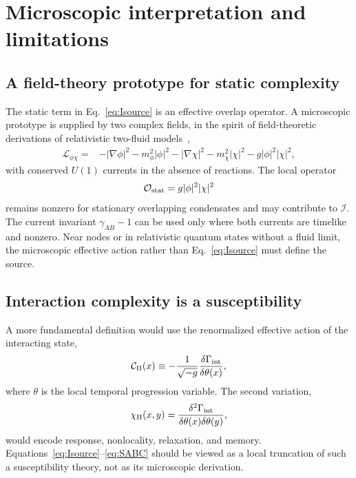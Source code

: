 \documentclass[11pt]{article}
\newcommand{\Lag}{\mathcal L}
\begin{document}
\section{Microscopic interpretation and limitations}

\subsection{A field-theory prototype for static complexity}

The static term in Eq.~\eqref{eq:Isource} is an effective overlap operator.  A microscopic prototype is supplied by two complex fields, in the spirit of field-theoretic derivations of relativistic two-fluid models~\cite{Alford2013},
\begin{align}
\Lag_{\phi\chi}
={}&-|\nabla\phi|^2-m_\phi^2|\phi|^2
-|\nabla\chi|^2-m_\chi^2|\chi|^2
-g|\phi|^2|\chi|^2,
\label{eq:complexScalarModel}
\end{align}
with conserved $U(1)$ currents in the absence of reactions.  The local operator
\begin{equation}
\mathcal O_{\rm stat}=g|\phi|^2|\chi|^2
\label{eq:Ostat}
\end{equation}
remains nonzero for stationary overlapping condensates and may contribute to $\mathcal I$.  The current invariant $\gamma_{AB}-1$ can be used only where both currents are timelike and nonzero.  Near nodes or in relativistic quantum states without a fluid limit, the microscopic effective action rather than Eq.~\eqref{eq:Isource} must define the source.

\subsection{Interaction complexity is a susceptibility}

A more fundamental definition would use the renormalized effective action of the interacting state,
\begin{equation}
\mathcal C_\Pi(x)
\equiv
-\frac{1}{\sqrt{-g}}
\frac{\delta\Gamma_{\rm int}}
{\delta\theta(x)},
\label{eq:susceptibilityDefinition}
\end{equation}
where $\theta$ is the local temporal progression variable.  The second variation,
\begin{equation}
\chi_\Pi(x,y)
=\frac{\delta^2\Gamma_{\rm int}}
{\delta\theta(x)\delta\theta(y)},
\label{eq:responseKernel}
\end{equation}
would encode response, nonlocality, relaxation, and memory.  Equations~\eqref{eq:Isource}--\eqref{eq:SABC} should be viewed as a local truncation of such a susceptibility theory, not as its microscopic derivation.
\end{document}

